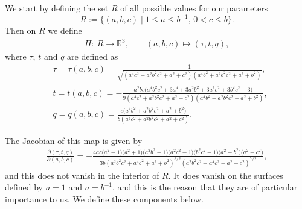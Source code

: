 \documentclass[10pt,a4paper]{amsart}
\numberwithin{equation}{section}
\begin{document}
 We start by defining the set $R$ of all possible values for our parameters
 \begin{equation} \label{eq:phasespaceabc}
 R := \bigl\{(a,b,c)\mid 1 \leq a \leq b^{-1},\, 0 < c \leq b\bigr\}.
 \end{equation}
 Then on $R$ we define
 \begin{align*}
 \Pi\colon \ R\longrightarrow \mathbb{R}^3, \qquad
 (a,b,c) \longmapsto (\tau,t,q),
 \end{align*}
 where
 $\tau$, $t$ and $q$ are defined as
 \begin{align*}
 &\tau= \tau(a,b,c) = \frac{1}{\sqrt{(a^4c^2 + a^2b^2c^2 + a^2 + c^2)(a^4b^2 + a^2b^2c^2 + a^2 + b^2)}}, \\
 &t= t(a,b,c) = -\frac{a^2bc\bigl(a^4b^2c^2 + 3a^4 + 3a^2b^2 + 3a^2c^2 + 3b^2c^2 - 3\bigr)}{9(a^4c^2 + a^2b^2c^2 + a^2 + c^2)(a^4b^2 + a^2b^2c^2 + a^2 + b^2)},\\
 &q= q(a,b,c) = \frac{c\bigl(a^4b^2 + a^2b^2c^2 + a^2 + b^2\bigr)}{b(a^4c^2 + a^2b^2c^2 + a^2 + c^2)}.
 \end{align*}

 The Jacobian of this map is given by
 \begin{gather}\label{eq:jacobian}
 \frac{\partial(\tau,t,q)}{\partial(a,b,c)} = -\frac{4ac\bigl(a^2-1\bigr)\bigl(a^2+1\bigr)\bigl(a^2b^2-1\bigr)\bigl(a^2c^2-1\bigr)\bigl(b^2c^2-1\bigr)\bigl(a^2-b^2\bigr)\bigl(a^2-c^2\bigr)}{3b(a^2b^2c^2 + a^4b^2+a^2+b^2)^{3/2}(a^2b^2c^2+a^4c^2 + a^2+c^2)^{7/2}},
 \end{gather}
and this does not vanish in the interior of $R$. It does vanish on the surfaces defined by $a=1$ and $a=b^{-1}$, and this is the reason that they are of particular importance to us. We define these components below.
\end{document}
